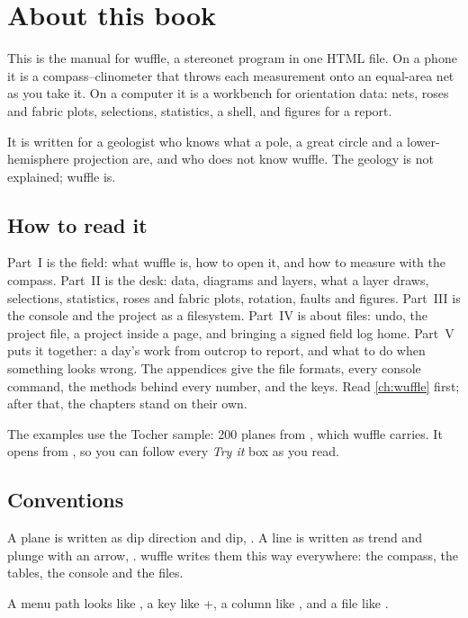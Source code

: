\chapter*{About this book}

This is the manual for wuffle, a stereonet program in one HTML file. On a phone it is a
compass--clinometer that throws each measurement onto an equal-area net as you take it. On a computer it
is a workbench for orientation data: nets, roses and fabric plots, selections, statistics, a shell, and
figures for a report.

It is written for a geologist who knows what a pole, a great circle and a lower-hemisphere projection
are, and who does not know wuffle. The geology is not explained; wuffle is.

\section*{How to read it}

Part~I is the field: what wuffle is, how to open it, and how to measure with the compass. Part~II is the
desk: data, diagrams and layers, what a layer draws, selections, statistics, roses and fabric plots,
rotation, faults and figures. Part~III is the console and the project as a filesystem. Part~IV is about
files: undo, the project file, a project inside a page, and bringing a signed field log home. Part~V
puts it together: a day's work from outcrop to report, and what to do when something looks wrong. The
appendices give the file formats, every console command, the methods behind every number, and the keys.
Read \cref{ch:wuffle} first; after that,
the chapters stand on their own.

The examples use the Tocher sample: 200 planes from \textcite{tocher1979}, which wuffle carries. It opens
from , so you can follow every \emph{Try it} box as you read.

\section*{Conventions}

A plane is written as dip direction and dip, . A line is written as trend and plunge with
an arrow, . wuffle writes them this way everywhere: the compass, the tables, the console
and the files.

A menu path looks like , a key like +, a column
like , and a file like .

